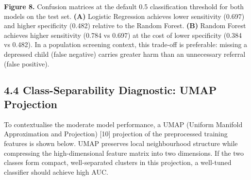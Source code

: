 \documentclass[11pt]{article}
\begin{document}
    \textbf{Figure 8.} Confusion matrices at the default 0.5 classification
threshold for both models on the test set. \textbf{(A)} Logistic
Regression achieves lower sensitivity (0.697) and higher specificity
(0.482) relative to the Random Forest. \textbf{(B)} Random Forest
achieves higher sensitivity (0.784 vs 0.697) at the cost of lower
specificity (0.384 vs 0.482). In a population screening context, this
trade-off is preferable: missing a depressed child (false negative)
carries greater harm than an unnecessary referral (false positive).

    \hypertarget{class-separability-diagnostic-umap-projection}{%
\subsection{4.4 Class-Separability Diagnostic: UMAP
Projection}\label{class-separability-diagnostic-umap-projection}}

To contextualise the moderate model performance, a UMAP (Uniform
Manifold Approximation and Projection) {[}10{]} projection of the
preprocessed training features is shown below. UMAP preserves local
neighbourhood structure while compressing the high-dimensional feature
matrix into two dimensions. If the two classes form compact,
well-separated clusters in this projection, a well-tuned classifier
should achieve high AUC.
\end{document}
